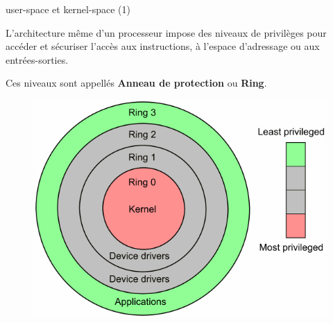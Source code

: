 \documentclass[12pt, t]{beamer}
\begin{document}
\begin{frame}{user-space et kernel-space (1)}

    \vspace{8pt}
    L'architecture même d'un processeur impose des niveaux de privilèges pour
    accéder et sécuriser l'accès aux instructions, à l'espace d'adressage
    ou aux entrées-sorties.

    {
        \vspace{8pt}
        Ces niveaux sont appellés {\textbf{Anneau de protection} ou \textbf{Ring}}.

        \begin{figure}
            \centering
            \includegraphics[scale=0.25]{ring.png}
        \end{figure}
    }

\end{frame}
\end{document}
